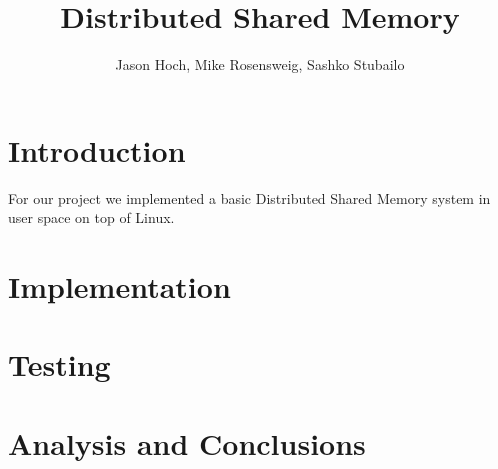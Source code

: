\documentclass[a4paper,10pt]{article}
\title{Distributed Shared Memory}
\author{Jason Hoch, Mike Rosensweig, Sashko Stubailo}
\begin{document}
\maketitle
\doublespace
\section{Introduction}
For our project we implemented a basic Distributed Shared Memory system in user
space on top of Linux.  
\section{Implementation}
\section{Testing}
\section{Analysis and Conclusions}
\end{document}

